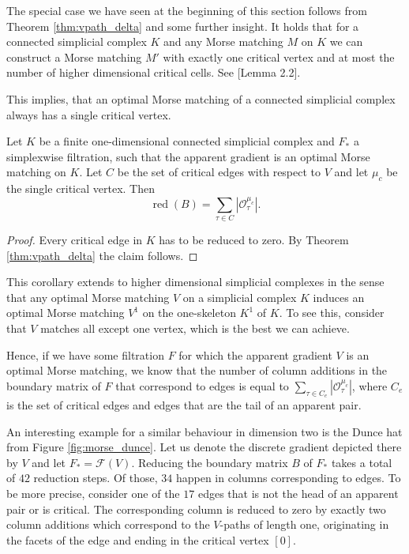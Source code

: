 The special case we have seen at the beginning of this section follows from Theorem \ref{thm:vpath_delta} and some further insight. 
It holds that for a connected simplicial complex $K$ and any Morse matching $M$ on $K$ we can construct a Morse matching $M'$ with exactly one critical vertex and at most the number of higher dimensional critical cells. See \cite{joswig2004computing}[Lemma 2.2]. 

This implies, that an optimal Morse matching of a connected simplicial complex always has a single critical vertex.

\begin{cor}
Let $K$ be a finite one-dimensional connected simplicial complex and $F_*$ a simplexwise filtration, such that the apparent gradient is an optimal Morse matching on $K$. Let $C$ be the set of critical edges with respect to $V$ and let $\mu_c$ be the single critical vertex. Then
\[ \operatorname{red}(B) = \sum_{\tau \in C} |\mathcal{O}_\tau^{\mu_c}|.
\]
\end{cor}
\begin{proof}
Every critical edge in $K$ has to be reduced to zero. By Theorem \ref{thm:vpath_delta} the claim follows.
\end{proof}

This corollary extends to higher dimensional simplicial complexes in the sense that any optimal Morse matching $V$ on a simplicial complex $K$ induces an optimal Morse matching $V^1$ on the one-skeleton $K^1$ of $K$. To see this, consider that $V$ matches all except one vertex, which is the best we can achieve. 

Hence, if we have some filtration $F$ for which the apparent gradient $V$ is an optimal Morse matching, we know that the number of column additions in the boundary matrix of $F$ that correspond to edges is equal to $\sum_{\tau \in C_e} |\mathcal{O}_{\tau}^{\mu_c}|$, where $C_e$ is the set of critical edges and edges that are the tail of an apparent pair.

An interesting example for a similar behaviour in dimension two is the Dunce hat from Figure \ref{fig:morse_dunce}. Let us denote the discrete gradient depicted there by $V$ and let $F_* = \mathcal{F}(V)$. Reducing the boundary matrix $B$ of $F_*$ takes a total of $42$ reduction steps. Of those, $34$ happen in columns corresponding to edges. To be more precise, consider one of the $17$ edges that is not the head of an apparent pair or is critical. The corresponding column is reduced to zero by exactly two column additions which correspond to the $V$-paths of length one, originating in the facets of the edge and ending in the critical vertex $[0]$. 

